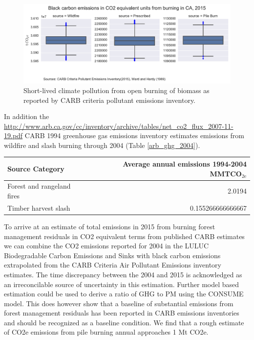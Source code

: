 \documentclass[a4paper]{article}
\begin{document}
\begin{figure}[htb]
\centering
\includegraphics[width=\textwidth]{./graphics/bc_prob_gwp.pdf}
\caption{Short-lived climate pollution from open burning of biomass as reported by CARB criteria pollutant emissions inventory.}
\end{figure}

In addition the
\url{http://www.arb.ca.gov/cc/inventory/archive/tables/net_co2_flux_2007-11-19.pdf}
CARB 1994 greenhouse gas emissions inventory estimates emissions from
wildfire and slash burning through 2004 (Table \ref{arb_ghg_2004}).
\begin{center}
\begin{tabular}{lr}
Source Category & Average annual emissions 1994-2004 MMTCO\(_{\text{2e}}\)\\
\hline
Forest and rangeland fires & 2.0194\\
Timber harvest slash & 0.155266666666667\\
\end{tabular}

\end{center}


To arrive at an estimate of total emissions in 2015 from burning forest
management residuals in CO2 equivalent terms from published CARB
estimates we can combine the CO2 emissions reported for 2004 in the
LULUC Biodegradable Carbon Emissions and Sinks with black carbon
emissions extrapolated from the CARB Criteria Air Pollutant Emissions
inventory estimates. The time discrepancy between the 2004 and 2015 is
acknowledged as an irreconcilable source of uncertainty in this
estimation. Further model based estimation could be used to derive a
ratio of GHG to PM using the CONSUME model. This does however show that a baseline of
substantial emissions from forest management residuals has been reported
in CARB emissions inventories and should be recognized as a baseline
condition. We find that a rough estimate of CO2e emissions from pile
burning annual approaches 1 Mt CO2e.
\end{document}
